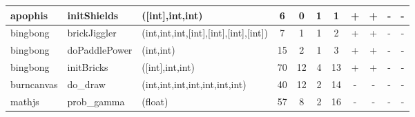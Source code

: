 \documentclass[sigconf,review]{acmart}
\begin{document}
\begin{table}[!t]
\begin{tabular}{l|l|p{2.7cm}|c|c|c|c|c|c|c|c}
    \hline
    apophis    & initShields & ([int],int,int)                                              & 6  & 0 & 1 & 1 & + & + & - & -\\
    \hline
    bingbong   & brickJiggler & (int,int,int,[int],[int],[int],[int]) & 7  & 1  & 1 & 2  & + & + & - & - \\
    bingbong   & doPaddlePower & (int,int)                            & 15 & 2  & 1 & 3  & + & + & - & - \\
    bingbong   & initBricks & ([int],int,int)                         & 70 & 12 & 4 & 13 & + & + & - & - \\
    \hline
    burncanvas & do\_draw & (int,int,int,int,int,int,int)                 & 40 & 12 & 2 & 14 & - & - & - & - \\
    \hline
    mathjs     & prob\_gamma & (float)                                   & 57 & 8  & 2 & 16 & - & - & - & - \\
    \bottomrule
  \end{tabular}
\end{table}
\end{document}
